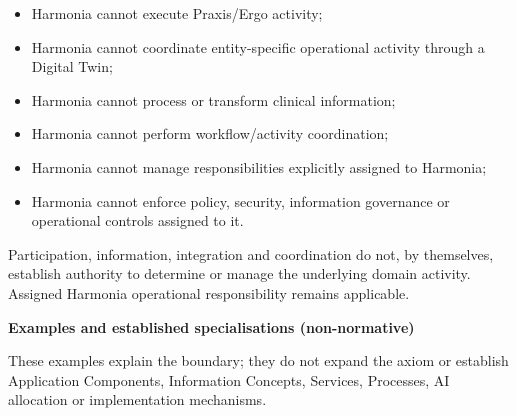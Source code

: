 \begin{itemize}


\item Harmonia cannot execute Praxis/Ergo activity;

\item Harmonia cannot coordinate entity-specific operational activity through a Digital Twin;

\item Harmonia cannot process or transform clinical information;

\item Harmonia cannot perform workflow/activity coordination;

\item Harmonia cannot manage responsibilities explicitly assigned to Harmonia;

\item Harmonia cannot enforce policy, security, information governance or operational controls assigned to it.

\end{itemize}


Participation, information, integration and coordination do not, by
themselves, establish authority to determine or manage the underlying domain
activity. Assigned Harmonia operational responsibility remains applicable.



\par\medskip\textbf{Examples and established specialisations (non-normative)}\par


These examples explain the boundary; they do not expand the axiom or
establish Application Components, Information Concepts, Services, Processes,
AI allocation or implementation mechanisms.



